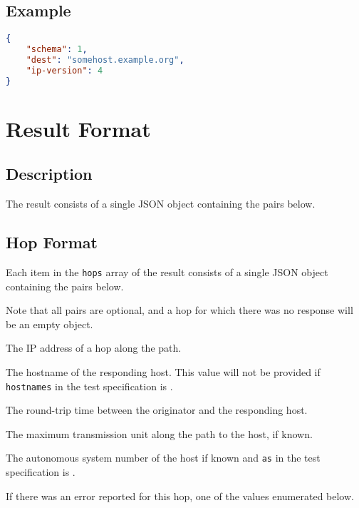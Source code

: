 \documentclass[10pt]{article}
\begin{document}


\subsection{Example}
\begin{lstlisting}[language=json]
{
    "schema": 1,
    "dest": "somehost.example.org",
    "ip-version": 4
}
\end{lstlisting}



%
%

\section{Result Format}

\subsection{Description}
The result consists of a single JSON object containing the pairs
below.  \seejson


\subsection{Hop Format}

Each item in the {\tt hops} array of the result consists of a single
JSON object containing the pairs below.  \seejson

Note that  all pairs are  optional, and a  hop for which there  was no
response will be an empty object.

 The IP address of a hop along the path.

 The hostname of the responding host.  This
value will not be provided if {\tt hostnames} in the test
specification is \false.

 The round-trip time between the originator
and the responding host.

 The maximum transmission unit along the path
to the host, if known.

 The autonomous system number of the host if
known and {\tt as} in the test specification is \true.

 If there was an error reported for this hop,
one of the values enumerated below.
\end{document}
